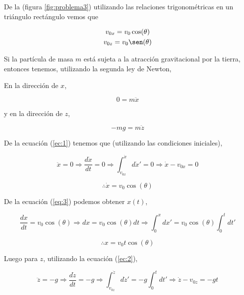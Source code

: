 \documentclass[a4paper,10pt]{article}
\numberwithin{equation}{section}
\begin{document}
\vspace{.3cm}

De la (figura \ref{fig:problema3}) utilizando las relaciones trigonométricas en un 
triángulo rectángulo vemos que

\begin{gather*}
v_{0x} = v_0\cos(\theta) \\
v_{0z} = v_0\sen(\theta)
\end{gather*}


Si la partícula de masa $m$ está sujeta a la atracción gravitacional
por la tierra, entonces tenemos, utilizando la segunda ley de Newton,

\vspace{.3cm}

En la dirección de $x$,

\begin{equation}
 0 = m \ddot{x}
 \label{ec:1}
\end{equation}

y en la dirección de $z$,

\begin{equation}
 - mg = m \ddot{z}
  \label{ec:2}
\end{equation}

De la ecuación (\ref{ec:1}) tenemos que (utilizando las condiciones iniciales),

\begin{equation*}
 \ddot{x} = 0 \Rightarrow \frac{d\dot{x}}{dt} = 0 \Rightarrow 
 \int_{v_{0x}}^{\dot{x}}d\dot{x}' = 0 \Rightarrow \dot{x} - v_{0x} = 0 
 \end{equation*}

\begin{equation}
 \therefore \dot{x} = v_0 \cos(\theta)
 \label{eq:3}
\end{equation}

De la ecuación (\ref{eq:3}) podemos obtener $x(t)$, 

\begin{equation*}
 \frac{dx}{dt} = v_0 \cos(\theta) \Rightarrow dx = v_0 \cos(\theta) dt \Rightarrow
 \int_0^x dx' = v_0 \cos(\theta) \int_0^t dt'
\end{equation*}

\begin{equation}
 \therefore x = v_0 t \cos(\theta)
 \label{eq:4}
\end{equation}

Luego para $z$, utilizando la ecuación (\ref{ec:2}),

\begin{equation*}
 \ddot{z} = -g \Rightarrow \frac{d\dot{z}}{dt} = -g \Rightarrow 
 \int_{v_{0z}}^{\dot{z}}d\dot{z}' = -g \int_0^t dt' \Rightarrow \dot{z} - v_{0z} = -gt 
 \end{equation*}
 
\end{document}
